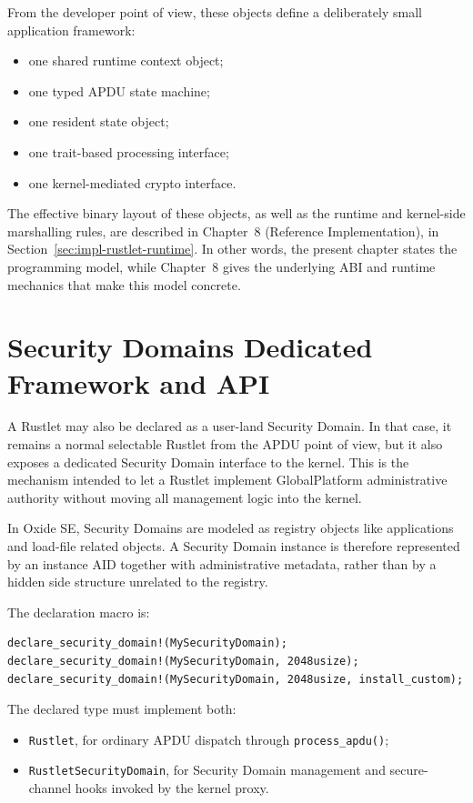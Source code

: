 From the developer point of view, these objects define a deliberately
small application framework:
\begin{itemize}
\item one shared runtime context object;
\item one typed APDU state machine;
\item one resident state object;
\item one trait-based processing interface;
\item one kernel-mediated crypto interface.
\end{itemize}

The effective binary layout of these objects, as well as the runtime and
kernel-side marshalling rules, are described in Chapter~8 (Reference
Implementation), in Section~\ref{sec:impl-rustlet-runtime}. In other
words, the present chapter states the programming model, while
Chapter~8 gives the underlying ABI and runtime mechanics that make this
model concrete.

\section{Security Domains Dedicated Framework and API}
\label{sec:rustlets-security-domain-framework}

A Rustlet may also be declared as a user-land Security Domain. In that
case, it remains a normal selectable Rustlet from the APDU point of
view, but it also exposes a dedicated Security Domain interface to the
kernel. This is the mechanism intended to let a Rustlet implement
GlobalPlatform administrative authority without moving all management
logic into the kernel.

In Oxide SE, Security Domains are modeled as registry objects like
applications and load-file related objects. A Security Domain instance is
therefore represented by an instance AID together with administrative metadata,
rather than by a hidden side structure unrelated to the registry.

The declaration macro is:
\begin{verbatim}
declare_security_domain!(MySecurityDomain);
declare_security_domain!(MySecurityDomain, 2048usize);
declare_security_domain!(MySecurityDomain, 2048usize, install_custom);
\end{verbatim}

The declared type must implement both:
\begin{itemize}
\item \texttt{Rustlet}, for ordinary APDU dispatch through
  \texttt{process\_apdu()};
\item \texttt{RustletSecurityDomain}, for Security Domain management
  and secure-channel hooks invoked by the kernel proxy.
\end{itemize}

